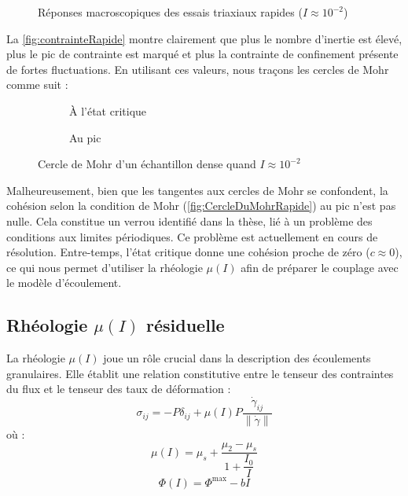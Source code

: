 \documentclass[a4paper,12pt]{report}
\begin{document}
\begin{figure}[h!]
\centering
\scalebox{0.5}{}
\caption{Réponses macroscopiques des essais triaxiaux rapides ($I \approx 10^{-2}$)}
\label{fig:contrainteRapide}
\end{figure}

La \autoref{fig:contrainteRapide} montre clairement que plus le nombre d’inertie est élevé, plus le pic de contrainte est marqué et plus la contrainte de confinement présente de fortes fluctuations.  
En utilisant ces valeurs, nous traçons les cercles de Mohr comme suit :

\begin{figure}[htbp]
    \centering
    \begin{subfigure}[b]{0.49\textwidth}
        \centering
        \scalebox{0.5}{}
        \caption{À l’état critique}
        \label{fig:muresiduel}
    \end{subfigure}
    \hfill
    \begin{subfigure}[b]{0.49\textwidth}
        \centering
        \scalebox{0.5}{}
        \caption{Au pic}
        \label{fig:mutransitore}
    \end{subfigure}
    \caption{Cercle de Mohr d’un échantillon dense quand $I \approx 10^{-2}$}
    \label{fig:CercleDuMohrRapide}
\end{figure}

Malheureusement, bien que les tangentes aux cercles de Mohr se confondent, la cohésion selon la condition de Mohr (\autoref{fig:CercleDuMohrRapide}) au pic n’est pas nulle.  
Cela constitue un verrou identifié dans la thèse, lié à un problème des conditions aux limites périodiques. Ce problème est actuellement en cours de résolution.  
Entre-temps, l’état critique donne une cohésion proche de zéro ($c \approx 0$), ce qui nous permet d’utiliser la rhéologie $\mu(I)$ afin de préparer le couplage avec le modèle d’écoulement.

\subsection{Rhéologie $\mu(I)$ résiduelle}

La rhéologie $\mu(I)$ joue un rôle crucial dans la description des écoulements granulaires. Elle établit une relation constitutive entre le tenseur des contraintes du flux et le tenseur des taux de déformation  \citep{jop2006constitutive} :
\begin{equation}
\sigma_{ij} = -P \delta_{ij} + \mu(I) P \frac{\dot{\gamma}_{ij}}{\lVert \dot{\gamma} \rVert}
\label{flowTensor}
\end{equation}
où :
\begin{equation}
\mu(I) = \mu_s + \dfrac{\mu_2 - \mu_s}{1 + \dfrac{I_0}{I}}
\label{muI}
\end{equation}
\begin{equation}
\Phi(I) = \Phi^{\max} - bI
\label{phiI}
\end{equation}
\end{document}

